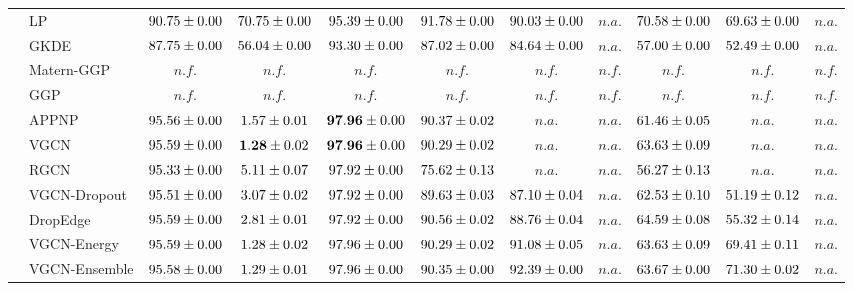 \begin{table*}[!h]
{\begin{tabular}{ll|cc|cccc|ccc}
        & LP & ${90.75\tiny \pm 0.00}$ & ${70.75\tiny \pm 0.00}$ & ${95.39\tiny \pm 0.00}$ & ${{91.78}\tiny \pm 0.00}$ & ${90.03\tiny \pm 0.00}$ & $n.a.$ & ${{70.58}\tiny \pm 0.00}$ & ${69.63\tiny \pm 0.00}$ & $n.a.$\\
        & GKDE & ${87.75\tiny \pm 0.00}$ & ${56.04\tiny \pm 0.00}$ & ${93.30\tiny \pm 0.00}$ & ${87.02\tiny \pm 0.00}$ & ${84.64\tiny \pm 0.00}$ & $n.a.$ & ${57.00\tiny \pm 0.00}$ & ${52.49\tiny \pm 0.00}$ & $n.a.$\\
        & Matern-GGP & $n.f.$ & $n.f.$ & $n.f.$ & $n.f.$ & $n.f.$ & $n.f.$ & $n.f.$ & $n.f.$ & $n.f.$\\
        & GGP & $n.f.$ & $n.f.$ & $n.f.$ & $n.f.$ & $n.f.$ & $n.f.$ & $n.f.$ & $n.f.$ & $n.f.$\\
        & APPNP & ${95.56\tiny \pm 0.00}$ & ${1.57\tiny \pm 0.01}$ & ${\mathbf{97.96}\tiny \pm 0.00}$ & ${90.37\tiny \pm 0.02}$ & $n.a.$ & $n.a.$ & ${61.46\tiny \pm 0.05}$ & $n.a.$ & $n.a.$\\
        & VGCN & ${95.59\tiny \pm 0.00}$ & ${\mathbf{1.28}\tiny \pm 0.02}$ & ${\mathbf{97.96}\tiny \pm 0.00}$ & ${90.29\tiny \pm 0.02}$ & $n.a.$ & $n.a.$ & ${63.63\tiny \pm 0.09}$ & $n.a.$ & $n.a.$\\
        & RGCN & ${95.33\tiny \pm 0.00}$ & ${5.11\tiny \pm 0.07}$ & ${97.92\tiny \pm 0.00}$ & ${75.62\tiny \pm 0.13}$ & $n.a.$ & $n.a.$ & ${56.27\tiny \pm 0.13}$ & $n.a.$ & $n.a.$\\
        & VGCN-Dropout & ${95.51\tiny \pm 0.00}$ & ${3.07\tiny \pm 0.02}$ & ${97.92\tiny \pm 0.00}$ & ${89.63\tiny \pm 0.03}$ & ${87.10\tiny \pm 0.04}$ & $n.a.$ & ${62.53\tiny \pm 0.10}$ & ${51.19\tiny \pm 0.12}$ & $n.a.$\\
        & DropEdge & ${95.59\tiny \pm 0.00}$ & ${2.81\tiny \pm 0.01}$ & ${97.92\tiny \pm 0.00}$ & ${90.56\tiny \pm 0.02}$ & ${88.76\tiny \pm 0.04}$ & $n.a.$ & ${64.59\tiny \pm 0.08}$ & ${55.32\tiny \pm 0.14}$ & $n.a.$\\
        & VGCN-Energy & ${95.59\tiny \pm 0.00}$ & ${1.28\tiny \pm 0.02}$ & ${97.96\tiny \pm 0.00}$ & ${90.29\tiny \pm 0.02}$ & ${91.08\tiny \pm 0.05}$ & $n.a.$ & ${63.63\tiny \pm 0.09}$ & ${69.41\tiny \pm 0.11}$ & $n.a.$\\
        & VGCN-Ensemble & ${95.58\tiny \pm 0.00}$ & ${1.29\tiny \pm 0.01}$ & ${97.96\tiny \pm 0.00}$ & ${90.35\tiny \pm 0.00}$ & ${92.39\tiny \pm 0.00}$ & $n.a.$ & ${63.67\tiny \pm 0.00}$ & ${71.30\tiny \pm 0.02}$ & $n.a.$\\

\end{tabular}}
\end{table*}
